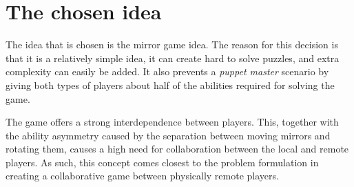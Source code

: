 \section{The chosen idea} \label{sec:chosenidea}
	The idea that is chosen is the mirror game idea. The reason for this
	decision is that it is a relatively simple idea, it can create hard
	to solve puzzles, and extra complexity can easily be added. It also
	prevents a \emph{puppet master} scenario by giving both types of players
	about half of the abilities required for solving the game.

	The game offers a strong interdependence between players. This, together
	with the ability asymmetry caused by the separation between moving mirrors
	and rotating them, causes a high need for collaboration between the local
	and remote players. As such, this concept comes closest to the problem
	formulation in creating a collaborative game between physically remote
	players.
